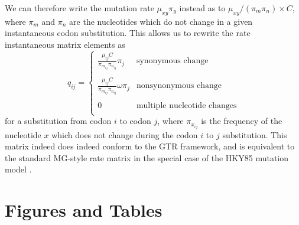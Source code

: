\documentclass[11pt]{article}
\begin{document}
We can therefore write the mutation rate $\mu_{xy}\pi_y$ instead as to $\mu_{xy} / (\pi_m\pi_n) \times C$, where $\pi_m$ and $\pi_n$ are the nucleotides which do not change in a given instantaneous codon substitution. This allows us to rewrite the rate instantaneous matrix elements as 
\begin{equation}
q_{ij} = \left\{ 
\begin{array}{rl}
\frac{\mu_{ij}C}{\pi_{m_{ij}}\pi_{n_{ij}}}\pi_j               &\mbox{synonymous change} \\\\
\frac{\mu_{ij}C}{\pi_{m_{ij}}\pi_{n_{ij}}}\omega\pi_j         &\mbox{nonsynonymous change} \\\\
0                                                     &\mbox{multiple nucleotide changes} \\           
\end{array} \right.
\end{equation} for a substitution from codon $i$ to codon $j$, where $\pi_{x_{ij}}$ is the frequency of the nucleotide $x$ which does not change during the codon $i$ to $j$ substitution. This matrix indeed does indeed conform to the GTR framework, and is equivalent to the standard MG-style rate matrix \cite{MuseGaut1994} in the special case of the HKY85 mutation model \cite{HKY85}.
		
		

		
		


		
		
	
	
\section*{Figures and Tables}

\vspace{2cm}
	
\end{document}
